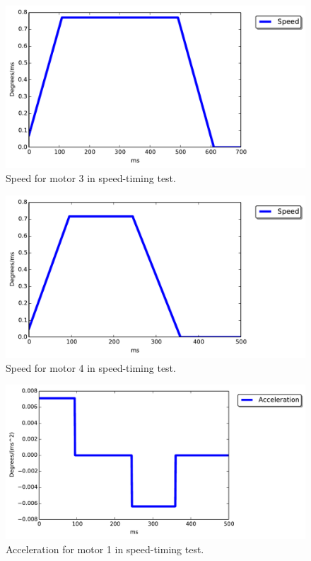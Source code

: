 \begin{figure}[ht]
\includegraphics[width=\textwidth]{test_res/speed_tests/Speed_motor3.pdf}
\caption{Speed for motor 3 in speed-timing test.}
\label{fig:speed_3}
\end{figure}

\begin{figure}[ht]
\includegraphics[width=\textwidth]{test_res/speed_tests/Speed_motor4.pdf}
\caption{Speed for motor 4 in speed-timing test.}
\label{fig:speed_4}
\end{figure}

\begin{figure}[ht]
\includegraphics[width=\textwidth]{test_res/speed_tests/Acc_motor1.pdf}
\caption{Acceleration for motor 1 in speed-timing test.}
\label{fig:acc1}
\end{figure}

